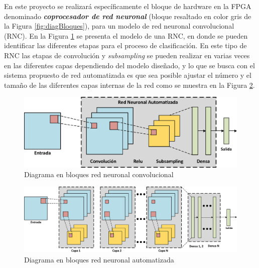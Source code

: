 \documentclass[11pt]{charter}
\begin{document}
\vspace{25px}

En este proyecto se realizará específicamente el bloque de hardware en la FPGA denominado \textit{\textbf{coprocesador de red neuronal}} (bloque resaltado en color gris de la Figura \ref{fig:diagBloques}), para un modelo de red neuronal convolucional (RNC). En la Figura \ref{fig:RN1} se presenta el modelo de una RNC, en donde se pueden identificar las diferentes etapas para el proceso de clasificación. En este tipo de RNC las etapas de convolución y \textit{subsampling} se pueden realizar en varias veces en las diferentes capas dependiendo del modelo diseñado, y lo que se busca con el sistema propuesto de red automatizada es que sea posible ajustar el número y el tamaño de las diferentes capas internas de la red como se muestra en la Figura \ref{fig:RN2}.          

\vspace{25px}

\begin{figure}[htpb]
\centering 
\includegraphics[width=.9\textwidth]{./Figuras/RN1.eps}
\caption{Diagrama en bloques red neuronal convolucional}
\label{fig:RN1}
\end{figure}

\vspace{25px}

\begin{figure}[htpb]
\centering 
\includegraphics[width=.99\textwidth]{./Figuras/RN2.eps}
\caption{Diagrama en bloques red neuronal automatizada}
\label{fig:RN2}
\end{figure}

\vspace{25px}
\end{document}
